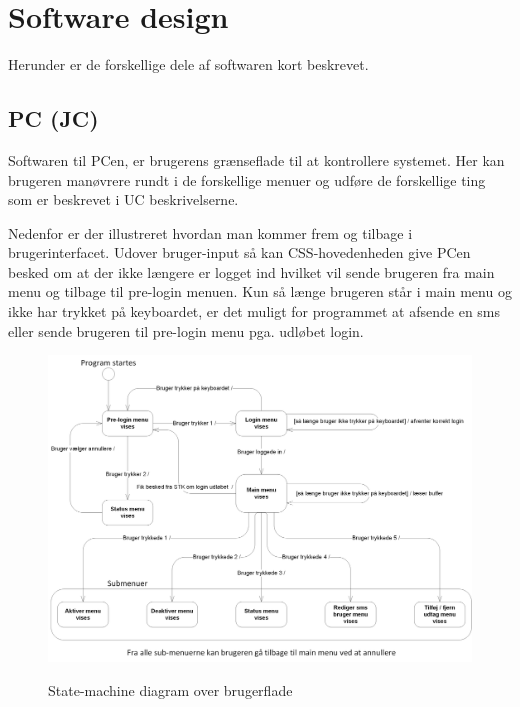 \clearpage

\section{Software design}

Herunder er de forskellige dele af softwaren kort beskrevet. 

\subsection{PC (JC)}

Softwaren til PCen, er brugerens grænseflade til at kontrollere systemet. Her kan brugeren manøvrere rundt i de forskellige menuer og udføre de forskellige ting som er beskrevet i UC beskrivelserne.

Nedenfor er der illustreret hvordan man kommer frem og tilbage i brugerinterfacet. Udover bruger-input så kan CSS-hovedenheden give PCen besked om at der ikke længere er logget ind hvilket vil sende brugeren fra main menu og tilbage til pre-login menuen. Kun så længe brugeren står i main menu og ikke har trykket på keyboardet, er det muligt for programmet at afsende en sms eller sende brugeren til pre-login menu pga. udløbet login.

\begin{figure}[htbp] \centering
{\includegraphics[width=\textwidth]{billeder/uml/state_machine_main}}
\caption{State-machine diagram over brugerflade}
\label{fig:State machine diagram over brugerflade}
\end{figure}



